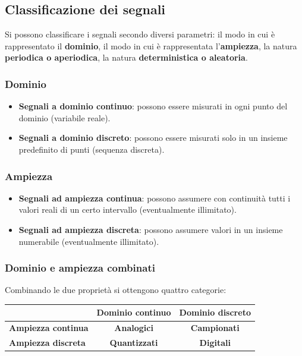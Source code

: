 \documentclass[12pt, a4paper]{article}
\begin{document}
\subsection{Classificazione dei segnali}

Si possono classificare i segnali secondo diversi parametri: il modo in cui è rappresentato il \textbf{dominio}, il modo in cui è rappresentata l'\textbf{ampiezza}, la natura \textbf{periodica o aperiodica}, la natura \textbf{deterministica o aleatoria}.

\subsubsection{Dominio}
\begin{itemize}
    \item \textbf{Segnali a dominio continuo}: possono essere misurati in ogni punto del dominio (variabile reale).
    \item \textbf{Segnali a dominio discreto}: possono essere misurati solo in un insieme predefinito di punti (sequenza discreta).
\end{itemize}

\subsubsection{Ampiezza}
\begin{itemize}
    \item \textbf{Segnali ad ampiezza continua}: possono assumere con continuità tutti i valori reali di un certo intervallo (eventualmente illimitato).
    \item \textbf{Segnali ad ampiezza discreta}: possono assumere valori in un insieme numerabile (eventualmente illimitato).
\end{itemize}

\subsubsection{Dominio e ampiezza combinati}

Combinando le due proprietà si ottengono quattro categorie:

\begin{center}
\renewcommand{\arraystretch}{1.3}
\begin{tabular}{l|cc}
\toprule
 & \textbf{Dominio continuo} & \textbf{Dominio discreto} \\
\midrule
\textbf{Ampiezza continua} & \textcolor{orange!80!black}{\textbf{Analogici}} & \textcolor{orange!80!black}{\textbf{Campionati}} \\
\textbf{Ampiezza discreta} & \textcolor{orange!80!black}{\textbf{Quantizzati}} & \textcolor{orange!80!black}{\textbf{Digitali}} \\
\bottomrule
\end{tabular}
\end{center}
\end{document}
